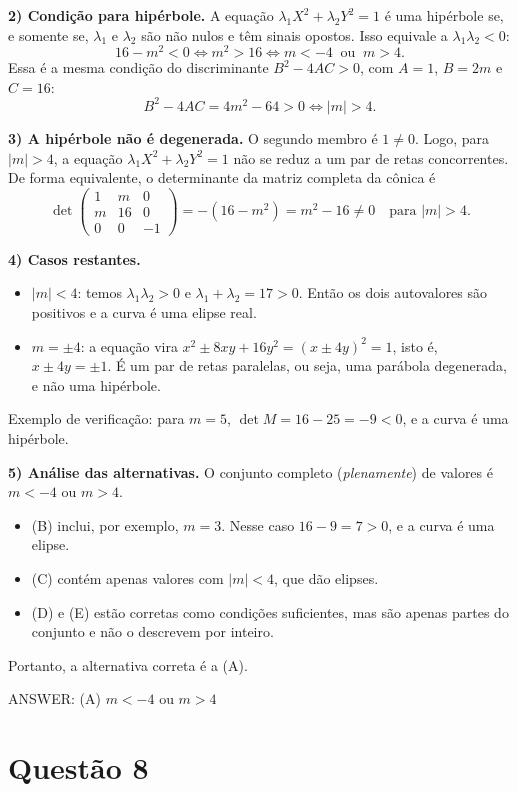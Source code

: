 \documentclass{article}%
\begin{document}
\textbf{2) Condição para hipérbole.} A equação $\lambda_1X^2+\lambda_2Y^2=1$ é uma hipérbole se, e somente se, $\lambda_1$ e $\lambda_2$ são não nulos e têm sinais opostos. Isso equivale a $\lambda_1\lambda_2<0$:
\[
16-m^2<0 \iff m^2>16 \iff m<-4\ \text{ ou }\ m>4 .
\]
Essa é a mesma condição do discriminante $B^2-4AC>0$, com $A=1$, $B=2m$ e $C=16$:
\[
B^2-4AC=4m^2-64>0 \iff |m|>4 .
\]

\textbf{3) A hipérbole não é degenerada.} O segundo membro é $1\neq 0$. Logo, para $|m|>4$, a equação $\lambda_1X^2+\lambda_2Y^2=1$ não se reduz a um par de retas concorrentes. De forma equivalente, o determinante da matriz completa da cônica é
\[
\det\begin{pmatrix}1 & m & 0\\ m & 16 & 0\\ 0 & 0 & -1\end{pmatrix}=-(16-m^2)=m^2-16\neq 0
\quad\text{para } |m|>4 .
\]

\textbf{4) Casos restantes.}
\begin{itemize}
\item $|m|<4$: temos $\lambda_1\lambda_2>0$ e $\lambda_1+\lambda_2=17>0$. Então os dois autovalores são positivos e a curva é uma elipse real.
\item $m=\pm4$: a equação vira $x^2\pm8xy+16y^2=(x\pm4y)^2=1$, isto é, $x\pm4y=\pm1$. É um par de retas paralelas, ou seja, uma parábola degenerada, e não uma hipérbole.
\end{itemize}
Exemplo de verificação: para $m=5$, $\det M=16-25=-9<0$, e a curva é uma hipérbole.

\textbf{5) Análise das alternativas.} O conjunto completo (\emph{plenamente}) de valores é $m<-4$ ou $m>4$.
\begin{itemize}
\item (B) inclui, por exemplo, $m=3$. Nesse caso $16-9=7>0$, e a curva é uma elipse.
\item (C) contém apenas valores com $|m|<4$, que dão elipses.
\item (D) e (E) estão corretas como condições suficientes, mas são apenas partes do conjunto e não o descrevem por inteiro.
\end{itemize}
Portanto, a alternativa correta é a (A).

ANSWER: (A) $m<-4$ ou $m>4$%
\newpage%
\section*{Questão 8}
\end{document}
